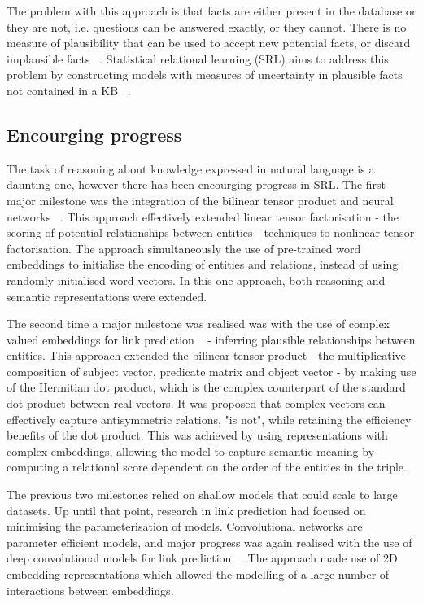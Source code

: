 \noindent The problem with this approach is that facts are either present in the database or they are not, i.e. questions can be answered exactly, or they cannot. There is no measure of plausibility that can be used to accept new potential facts, or discard implausible facts \unskip~\citep{koller2007introduction}. Statistical relational learning (SRL) aims to address this problem by constructing models with measures of uncertainty in plausible facts not contained in a KB \unskip~\citep{koller2007introduction}.\par

\subsection{Encourging progress} 

The task of reasoning about knowledge expressed in natural language is a daunting one, however there has been encourging progress in SRL. The first major milestone was the integration of the bilinear tensor product and neural networks \unskip~\citep{socher2013reasoning}. This approach effectively extended linear tensor factorisation - the scoring of potential relationships between entities - techniques to nonlinear tensor factorisation. The approach simultaneously the use of pre-trained word embeddings to initialise the encoding of entities and relations, instead of using randomly initialised word vectors. In this one approach, both reasoning and semantic representations were extended. \par

\noindent The second time a major milestone was realised was with the use of complex valued embeddings for link prediction \unskip~\citep{trouillon2016complex} - inferring plausible relationships between entities. This approach extended the bilinear tensor product - the multiplicative composition of subject vector, predicate matrix and object vector - by making use of the Hermitian dot product, which is the complex counterpart of the standard dot product between real vectors. It was proposed that complex vectors can effectively capture antisymmetric relations, "is not", while retaining the efficiency benefits of the dot product. This was achieved by using representations with complex embeddings, allowing the model to capture semantic meaning by computing a relational score dependent on the order of the entities in the triple. \par
 
\noindent The previous two milestones relied on shallow models that could scale to large datasets. Up until that point, research in link prediction had focused on minimising the parameterisation of models. Convolutional networks are parameter efficient models, and major progress was again realised with the use of deep convolutional models for link prediction \unskip~\citep{dettmers2018convolutional}. The approach made use of 2D embedding representations which allowed the modelling of a large number of interactions between embeddings. \par

